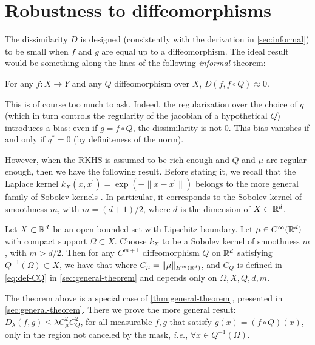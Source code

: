 
\section{Robustness to diffeomorphisms}\label{sec:robustness}


The dissimilarity $D$ is designed (consistently with the derivation in \cref{sec:informal}) to be small when $f$ and $g$ are equal up to a diffeomorphism. The ideal result would be something along the lines of the following \emph{informal} theorem:

\begin{theorem}[Ideal]\label{thm:ideal}
    For any $f: X \to Y$ and any $Q$ diffeomorphism over $X$, $D(f, f\circ Q) \approx 0.$
\end{theorem}

This is of course too much to ask. Indeed, the regularization over the choice of $q$ (which in turn controls the regularity of the jacobian of a hypothetical $Q$) introduces a bias:  even if $g = f \circ Q$, the dissimilarity is not $0$. This bias vanishes if and only if $q^*=0$ (by definiteness of the norm).

However, when the RKHS is assumed to be rich enough and $Q$ and $\mu$ are regular enough, then we have the following result. Before stating it, we recall that the Laplace kernel $k_X(x,x^\prime) = \exp(-\|x-x^\prime\|)$ belongs to the more general family of Sobolev kernels \cite{wendland2004scattered}. In particular, it corresponds to the Sobolev kernel of smoothness $m$, with $m = (d+1)/2$, where $d$ is the dimension of $X \subset \mathbb R^d$.
\begin{theorem}\label{theorem:main-theorem}
Let $X \subset \mathbb R^d$ be an open bounded set with Lipschitz boundary. Let $\mu \in C^\infty(\mathbb R^d)$ with compact support $\Omega \subset X$. Choose $k_X$ to be a Sobolev kernel of smoothness $m$, with $m > d/2$. Then for any $C^{m+1}$ diffeomorphism $Q$ on $\mathbb R^d$ satisfying $Q^{-1}(\Omega) \subset X$, we have that
where $C_\mu = \|\mu\|_{H^m(\mathbb R^d)}$, and $C_Q$ is defined in \cref{eq:def-CQ} in \cref{sec:general-theorem} and depends only on $\Omega, X, Q, d, m$.
\end{theorem}
The theorem above is a special case of \cref{thm:general-theorem}, presented in \cref{sec:general-theorem}. There we prove the more general result: $D_\lambda(f,g) \leq \lambda C^2_{\mu} C^2_{Q}$, for all measurable $f, g$ that satisfy $g(x) = (f \circ Q)(x)$, only in the region not canceled by the mask, \emph{i.e.}, $\forall x \in Q^{-1}(\Omega)$.



